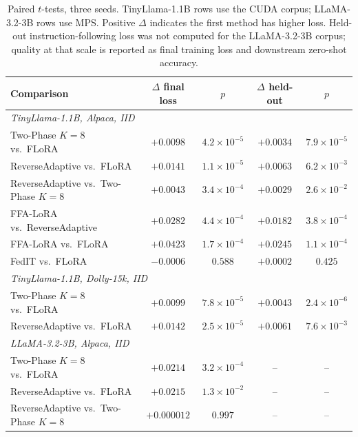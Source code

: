 \begin{table}[t]
\caption{Paired $t$-tests, three seeds. TinyLlama-1.1B rows use the CUDA corpus; LLaMA-3.2-3B rows use MPS. Positive $\Delta$ indicates the first method has higher loss. Held-out instruction-following loss was not computed for the LLaMA-3.2-3B corpus; quality at that scale is reported as final training loss and downstream zero-shot accuracy.}
\label{tab:d1}
\begin{center}
\footnotesize
\setlength{\tabcolsep}{4pt}
\begin{tabular}{lcccc}
\toprule
Comparison & $\Delta$ final loss & $p$ & $\Delta$ held-out & $p$ \\
\midrule
\multicolumn{5}{l}{\emph{TinyLlama-1.1B, Alpaca, IID}} \\
Two-Phase $K{=}8$ vs.\ FLoRA & $+0.0098$ & $4.2 \times 10^{-5}$ & $+0.0034$ & $7.9 \times 10^{-5}$ \\
ReverseAdaptive vs.\ FLoRA & $+0.0141$ & $1.1 \times 10^{-5}$ & $+0.0063$ & $6.2 \times 10^{-3}$ \\
ReverseAdaptive vs.\ Two-Phase $K{=}8$ & $+0.0043$ & $3.4 \times 10^{-4}$ & $+0.0029$ & $2.6 \times 10^{-2}$ \\
FFA-LoRA vs.\ ReverseAdaptive & $+0.0282$ & $4.4 \times 10^{-4}$ & $+0.0182$ & $3.8 \times 10^{-4}$ \\
FFA-LoRA vs.\ FLoRA & $+0.0423$ & $1.7 \times 10^{-4}$ & $+0.0245$ & $1.1 \times 10^{-4}$ \\
FedIT vs.\ FLoRA & $-0.0006$ & $0.588$ & $+0.0002$ & $0.425$ \\
\midrule
\multicolumn{5}{l}{\emph{TinyLlama-1.1B, Dolly-15k, IID}} \\
Two-Phase $K{=}8$ vs.\ FLoRA & $+0.0099$ & $7.8 \times 10^{-5}$ & $+0.0043$ & $2.4 \times 10^{-6}$ \\
ReverseAdaptive vs.\ FLoRA & $+0.0142$ & $2.5 \times 10^{-5}$ & $+0.0061$ & $7.6 \times 10^{-3}$ \\
\midrule
\multicolumn{5}{l}{\emph{LLaMA-3.2-3B, Alpaca, IID}} \\
Two-Phase $K{=}8$ vs.\ FLoRA & $+0.0214$ & $3.2 \times 10^{-4}$ & -- & -- \\
ReverseAdaptive vs.\ FLoRA & $+0.0215$ & $1.3 \times 10^{-2}$ & -- & -- \\
ReverseAdaptive vs.\ Two-Phase $K{=}8$ & $+0.000012$ & $0.997$ & -- & -- \\
\bottomrule
\end{tabular}
\end{center}
\end{table}

